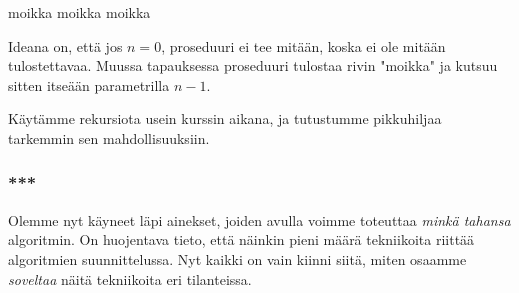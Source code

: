 \begin{code}
moikka
moikka
moikka
\end{code}

Ideana on, että jos $n=0$, proseduuri ei tee mitään,
koska ei ole mitään tulostettavaa.
Muussa tapauksessa proseduuri tulostaa rivin "moikka"
ja kutsuu sitten itseään parametrilla $n-1$.

Käytämme rekursiota usein kurssin aikana,
ja tutustumme pikkuhiljaa tarkemmin sen mahdollisuuksiin.

\subsubsection{***}

Olemme nyt käyneet läpi ainekset,
joiden avulla voimme toteuttaa \emph{minkä tahansa} algoritmin.
On huojentava tieto, että näinkin pieni määrä tekniikoita
riittää algoritmien suunnittelussa.
Nyt kaikki on vain kiinni siitä, miten osaamme \emph{soveltaa}
näitä tekniikoita eri tilanteissa.
